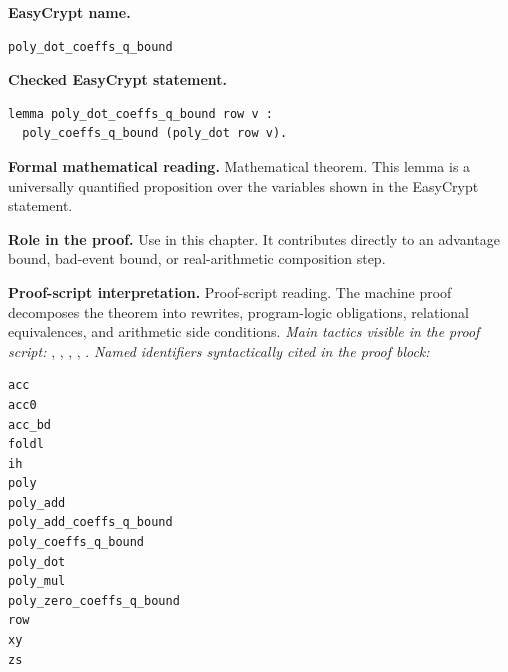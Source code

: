 \begin{formaltheorem}
\noindent\textbf{EasyCrypt name.}
\begin{lstlisting}[language=EasyCrypt,basicstyle=\ttfamily\scriptsize]
poly_dot_coeffs_q_bound
\end{lstlisting}
\noindent\textbf{Checked EasyCrypt statement.}
\begin{lstlisting}[language=EasyCrypt,basicstyle=\ttfamily\scriptsize]
lemma poly_dot_coeffs_q_bound row v :
  poly_coeffs_q_bound (poly_dot row v).
\end{lstlisting}
\noindent\textbf{Formal mathematical reading.}
Mathematical theorem. This lemma is a universally quantified proposition over the variables shown in the EasyCrypt statement.

\noindent\textbf{Role in the proof.}
Use in this chapter. It contributes directly to an advantage bound, bad-event bound, or real-arithmetic composition step.

\noindent\textbf{Proof-script interpretation.}
Proof-script reading. The machine proof decomposes the theorem into rewrites, program-logic obligations, relational equivalences, and arithmetic side conditions.
\emph{Main tactics visible in the proof script:} , , , , .
\emph{Named identifiers syntactically cited in the proof block:}
\begin{lstlisting}[language=EasyCrypt,basicstyle=\ttfamily\scriptsize]
acc
acc0
acc_bd
foldl
ih
poly
poly_add
poly_add_coeffs_q_bound
poly_coeffs_q_bound
poly_dot
poly_mul
poly_zero_coeffs_q_bound
row
xy
zs
\end{lstlisting}

\end{formaltheorem}

